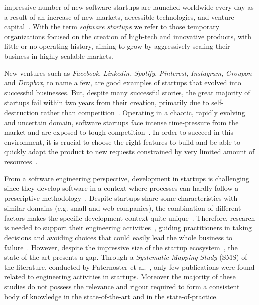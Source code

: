 \documentclass[10pt,journal,letterpaper,compsoc]{IEEEtran}
\begin{document}
%
%
%
%
 impressive number of new software startups are launched
worldwide every day as a result of an increase of new markets, accessible
technologies, and venture capital~\cite{8491286}. With the term
\textit{software startups} we refer to those temporary organizations focused on
the creation of high-tech and innovative products, with little or no operating
history, aiming to grow by aggressively scaling their business in highly
scalable markets.

New ventures such as \textit{Facebook}, \textit{Linkedin}, \textit{Spotify},
\textit{Pinterest}, \textit{Instagram}, \textit{Groupon} and \textit{Dropbox},
to name a few, are good examples of startups that evolved into successful
businesses. But, despite many successful stories, the great majority of startups
fail within two years from their creation, primarily due to self-destruction
rather than competition~\cite{Crowne2002}. Operating in a chaotic, rapidly
evolving and uncertain domain, software startups face intense time-pressure from
the market and are exposed to tough competition~\cite{Maccormack2001,
Eisenhardt1998}. In order to succeed in this environment, it is crucial to
choose the right features to build and be able to quickly adapt the product to
new requests constrained by very limited amount of resources~\cite{Sutton2000}.

From a software engineering perspective, development in startups is challenging
since they develop software in a context where processes can hardly follow a
prescriptive methodology~\cite{Sutton2000, Coleman2005}. Despite startups share
some characteristics with similar domains (e.g. small and web companies), the
combination of different factors makes the specific development context quite
unique~\cite{Blank2005,Sutton2000}. Therefore, research is needed to support
their engineering activities~\cite{Coleman2005}, guiding practitioners in taking
decisions and avoiding choices that could easily lead the whole business to
failure~\cite{Kajko-Mattsson2008}. However, despite the impressive size of the
startup ecosystem~\cite{ISI:000243253000007}, the state-of-the-art presents a
gap. Through a \textit{Systematic Mapping Study} (SMS) of the literature,
conducted by Paternoster et al.~\cite{SMS}, only few publications were found
related to engineering activities in startups. Moreover the majority of these
studies do not possess the relevance and rigour required to form a consistent
body of knowledge in the state-of-the-art and in the state-of-practice.
\end{document}
